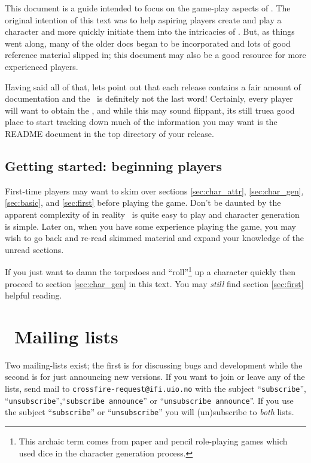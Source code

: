 This document is a guide intended to focus on the game-play aspects of \cf .
The original intention of this text was to
help aspiring players create and play a character and more quickly initiate
them into the intricacies of \cf . But, as things went along, many of the
older docs began to be incorporated and lots of good reference material
slipped in; this document may also be a good resource for more experienced
players.

Having said all of that, lets point out that each release contains
a fair amount of documentation and the \playbook\ is definitely not the
last word! Certainly, every player will want to obtain the \spoiler ,
and while this may sound flippant, its still true\emdash a good place to
start tracking down much of the information you may want is the
README document in the top directory of your release.


\subsection{Getting started: beginning players}

First-time players may want to skim over sections
\ref{sec:char_attr}, \ref{sec:char_gen}, \ref{sec:basic},
and \ref{sec:first} before playing the game. Don't be daunted by
the apparent complexity of \cf \emdash in reality \cf\ is quite easy
to play and character generation
is simple. Later on, when you have some experience
playing the game, you may wish to go back and re-read skimmed material
and expand your knowledge of the unread sections.

If you just want to damn the torpedoes and ``roll''\footnote{This archaic
term comes from paper and pencil role-playing games which used dice in
the character generation process.} up a character quickly then proceed
to section \ref{sec:char_gen} in this text. You may {\em still}
find section \ref{sec:first} helpful reading.


\section{\cf\ Mailing lists}\label{sec:mlist}

Two mailing-lists exist; the first is for discussing bugs and
development while the second is for just announcing new versions.
If you want to join or leave any of the lists, send mail to
{\tt crossfire-}{\tt request@}{\tt ifi.uio.no} with the subject ``{\tt subscribe}'',
``{\tt unsubscribe}'',``{\tt subscribe announce}'' or ``{\tt unsubscribe
announce}''.  If you use the subject ``{\tt subscribe}'' or
``{\tt unsubscribe}'' you will (un)subscribe to {\em both} lists.

